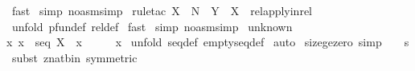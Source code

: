 \begin{isabellebody}
\isamarkupfalse%
\ fast\isanewline
{}\isamarkupfalse%
\ {\isacharparenleft}simp\ {\isacharparenleft}no{\isacharunderscore}asm{\isacharunderscore}simp{\isacharparenright}{\isacharparenright}\isanewline
{}\isamarkupfalse%
\ {\isacharparenleft}rule{\isacharunderscore}tac\ X\ {\isacharequal}\ {\isachardoublequoteopen}{\isacharpercent}N{\isachardoublequoteclose}\ \ Y\ {\isacharequal}\ {\isachardoublequoteopen}X{\isachardoublequoteclose}\ \ rel{\isacharunderscore}apply{\isacharunderscore}in{\isacharunderscore}rel{\isacharparenright}\isanewline
{}\isamarkupfalse%
\ {\isacharparenleft}unfold\ pfun{\isacharunderscore}def\ rel{\isacharunderscore}def{\isacharparenright}\isanewline
{}\isamarkupfalse%
\ fast\isanewline
{}\isamarkupfalse%
\ {\isacharparenleft}simp\ {\isacharparenleft}no{\isacharunderscore}asm{\isacharunderscore}simp{\isacharparenright}{\isacharparenright}\isanewline
{}\isamarkupfalse%
%
\endisatagproof
{\isafoldproof}%
%
\isadelimproof
\isanewline
%
\endisadelimproof
\isanewline
\isanewline
{}\isamarkupfalse%
\ unknown{\isacharcolon}\ \isanewline
{\isachardoublequoteopen}{\isacharbang}{\isacharbang}x{\isachardot}\ {\isacharbrackleft}{\isacharbar}x\ {\isacharcolon}\ seq\ X\ {\isacharsemicolon}\ x\ {\isachartilde}{\isacharequal}\ {\isacharpercent}{\isacharless}{\isacharpercent}{\isachargreater}{\isacharbar}{\isacharbrackright}\ {\isacharequal}{\isacharequal}{\isachargreater}\ {}\ {\isacharless}\ {\isacharhash}x{\isachardoublequoteclose}\isanewline
%
\isadelimproof
%
\endisadelimproof
%
\isatagproof
{}\isamarkupfalse%
\ {\isacharparenleft}unfold\ seq{\isacharunderscore}def\ emptyseq{\isacharunderscore}def{\isacharparenright}\isanewline
{}\isamarkupfalse%
\ auto\isanewline
{}\isamarkupfalse%
%
\endisatagproof
{\isafoldproof}%
%
\isadelimproof
\isanewline
%
\endisadelimproof
\isanewline
\isanewline
\isanewline
\isanewline
\isanewline
{}\isamarkupfalse%
\ size{\isacharunderscore}ge{\isacharunderscore}zero\ {\isacharbrackleft}simp{\isacharbrackright}{\isacharcolon}\ {\isachardoublequoteopen}{}\ {\isacharless}{\isacharequal}\ {\isacharhash}\ s{\isachardoublequoteclose}\isanewline
%
\isadelimproof
%
\endisadelimproof
%
\isatagproof
{}\isamarkupfalse%
\ {\isacharparenleft}subst\ znat{\isacharunderscore}bin{\isacharunderscore}{}\ {\isacharbrackleft}symmetric{\isacharbrackright}{\isacharparenright}\isanewline

\end{isabellebody}
